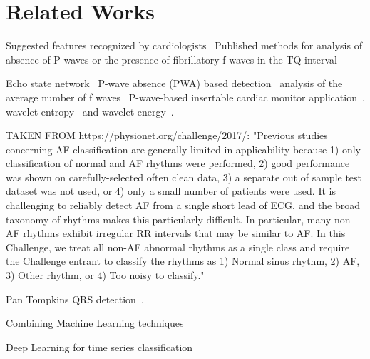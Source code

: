 \chapter{Related Works}


Suggested features recognized by cardiologists~\cite{reiffel2010practice}
Published methods for analysis of absence of P waves or the presence of fibrillatory f waves in the TQ interval

Echo state network~\cite{petrenas2012echo}
P-wave absence (PWA) based detection~\cite{ladavich2015rate}
analysis of the average number of f waves~\cite{du2014novel}
P-wave-based insertable cardiac monitor application~\cite{purerfellner2014p},
wavelet entropy~\cite{alcaraz2006wavelet, rodenas2015wavelet} and wavelet energy~\cite{garcia2016application}.

TAKEN FROM https://physionet.org/challenge/2017/:
"Previous studies concerning AF classification are generally limited in applicability because 1) only classification of normal and AF rhythms were performed, 2) good performance was shown on carefully-selected often clean data, 3) a separate out of sample test dataset was not used, or 4) only a small number of patients were used. It is challenging to reliably detect AF from a single short lead of ECG, and the broad taxonomy of rhythms makes this particularly difficult. In particular, many non-AF rhythms exhibit irregular RR intervals that may be similar to AF. In this Challenge, we treat all non-AF abnormal rhythms as a single class and require the Challenge entrant to classify the rhythms as 1) Normal sinus rhythm, 2) AF, 3) Other rhythm, or 4) Too noisy to classify."

Pan Tompkins QRS detection~\cite{waser2013removing}.

Combining Machine Learning techniques~\cite{geurts2001pattern}

Deep Learning for time series classification~\cite{langkvist2014review, wang2016time}
